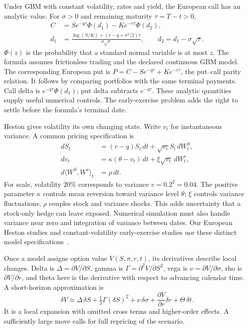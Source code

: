 \documentclass[8pt]{strategynet-journal}
\begin{document}
\begin{SNcolumns}
Under GBM with constant volatility, rates and yield, the European call has
an analytic value. For $\sigma>0$ and remaining maturity $\tau=T-t>0$,
\[
\begin{aligned}
 C&=Se^{-q\tau}\Phi(d_1)-Ke^{-r\tau}\Phi(d_2),\\
 d_1&=\frac{\log(S/K)+(r-q+\sigma^2/2)\tau}{\sigma\sqrt\tau},\qquad
 d_2=d_1-\sigma\sqrt\tau.
\end{aligned}
\]
$\Phi(z)$ is the probability that a standard normal variable is at most $z$.
The formula assumes frictionless trading and the declared continuous GBM model.
The corresponding European put is $P=C-Se^{-q\tau}+Ke^{-r\tau}$, the put--call
parity relation. It follows by comparing portfolios with the same terminal
payments. Call delta is $e^{-q\tau}\Phi(d_1)$; put delta subtracts $e^{-q\tau}$.
These analytic quantities supply useful numerical controls. The early-exercise
problem adds the right to settle before the formula's terminal date.

Heston gives volatility its own changing state. Write $v_t$ for instantaneous
variance. A common pricing specification is
\[
\begin{aligned}
 dS_t&=(r-q)S_t\,dt+\sqrt{v_t}S_t\,dW_t^S,\\
 dv_t&=\kappa(\theta-v_t)\,dt+\xi\sqrt{v_t}\,dW_t^v,\\
 d\langle W^S,W^v\rangle_t&=\rho\,dt.
\end{aligned}
\]
For scale, volatility 20\% corresponds to variance $v=0.2^2=0.04$.
The positive parameter $\kappa$ controls mean reversion toward variance level
$\theta$; $\xi$ controls variance fluctuations; $\rho$ couples stock and variance
shocks. This adds uncertainty that a stock-only hedge can leave exposed.
Numerical simulation must also handle variance near zero and integration of
variance between dates. Our European Heston studies and constant-volatility
early-exercise studies use these distinct model specifications~\cite{heston}.

Once a model assigns option value $V(S,\sigma,r,t)$, its derivatives describe
local changes. Delta is $\Delta=\partial V/\partial S$, gamma is
$\Gamma=\partial^2V/\partial S^2$, vega is $\nu=\partial V/\partial\sigma$,
rho is $\partial V/\partial r$, and theta here is the derivative with respect
to advancing calendar time. A short-horizon approximation is
\[
 \delta V\approx\Delta\,\delta S+
 \tfrac12\Gamma(\delta S)^2+\nu\,\delta\sigma+
 \frac{\partial V}{\partial r}\delta r+\Theta\,\delta t.
\]
It is a local expansion with omitted cross terms and higher-order effects.
A sufficiently large move calls for full repricing of the scenario.


\end{SNcolumns}
\end{document}
